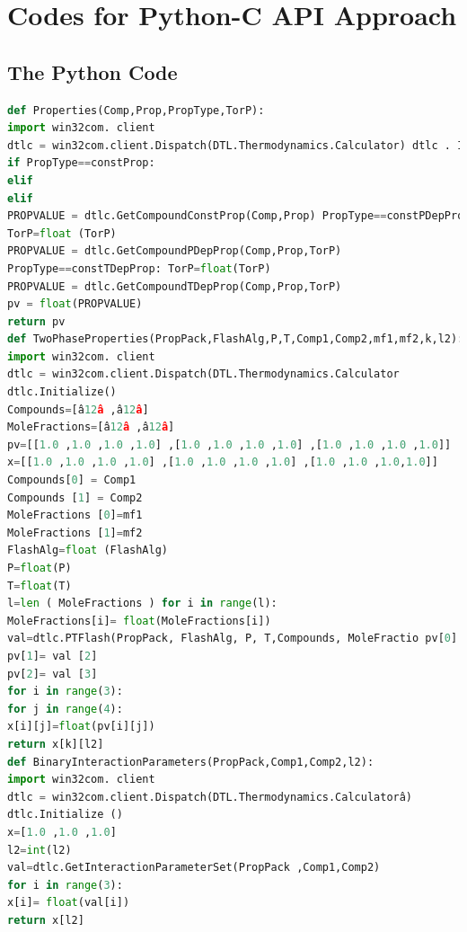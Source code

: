 \documentclass[12pt]{report}
\begin{document}
\appendix
\chapter{Codes for Python-C API Approach}
\label{appenA}
\section{The Python Code}
\begin{lstlisting}[language=Python]
def Properties(Comp,Prop,PropType,TorP):
import win32com. client
dtlc = win32com.client.Dispatch(DTL.Thermodynamics.Calculator) dtlc . Initialize ()
if PropType==constProp:
elif
elif
PROPVALUE = dtlc.GetCompoundConstProp(Comp,Prop) PropType==constPDepProp:
TorP=float (TorP)
PROPVALUE = dtlc.GetCompoundPDepProp(Comp,Prop,TorP)
PropType==constTDepProp: TorP=float(TorP)
PROPVALUE = dtlc.GetCompoundTDepProp(Comp,Prop,TorP)
pv = float(PROPVALUE)
return pv
def TwoPhaseProperties(PropPack,FlashAlg,P,T,Comp1,Comp2,mf1,mf2,k,l2):
import win32com. client
dtlc = win32com.client.Dispatch(DTL.Thermodynamics.Calculator
dtlc.Initialize() 
Compounds=[â12â ,â12â]
MoleFractions=[â12â ,â12â]
pv=[[1.0 ,1.0 ,1.0 ,1.0] ,[1.0 ,1.0 ,1.0 ,1.0] ,[1.0 ,1.0 ,1.0 ,1.0]]
x=[[1.0 ,1.0 ,1.0 ,1.0] ,[1.0 ,1.0 ,1.0 ,1.0] ,[1.0 ,1.0 ,1.0,1.0]] 
Compounds[0] = Comp1
Compounds [1] = Comp2
MoleFractions [0]=mf1
MoleFractions [1]=mf2
FlashAlg=float (FlashAlg)
P=float(P)
T=float(T)
l=len ( MoleFractions ) for i in range(l):
MoleFractions[i]= float(MoleFractions[i]) 
val=dtlc.PTFlash(PropPack, FlashAlg, P, T,Compounds, MoleFractio pv[0] = val[1]
pv[1]= val [2]
pv[2]= val [3]
for i in range(3):
for j in range(4):
x[i][j]=float(pv[i][j])
return x[k][l2]
def BinaryInteractionParameters(PropPack,Comp1,Comp2,l2): 
import win32com. client
dtlc = win32com.client.Dispatch(DTL.Thermodynamics.Calculatorâ) 
dtlc.Initialize ()
x=[1.0 ,1.0 ,1.0]
l2=int(l2)
val=dtlc.GetInteractionParameterSet(PropPack ,Comp1,Comp2)
for i in range(3):
x[i]= float(val[i])
return x[l2]
\end{lstlisting}
\end{document}

